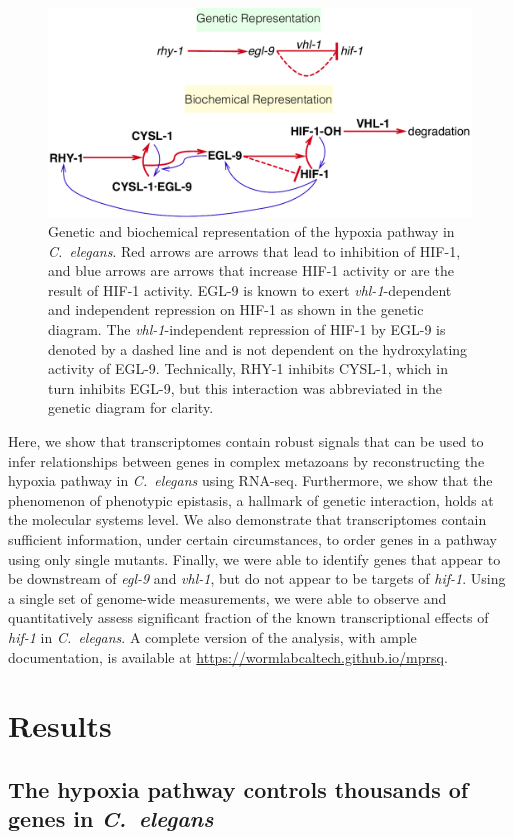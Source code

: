 \documentclass[10pt, onecolumn]{article}
\newcommand{\cel}{\emph{C.~elegans}}
\newcommand{\gene}[1]{\emph{#1}}
\newcommand{\eglp}{EGL-9}
\newcommand{\hifp}{HIF-1}
\begin{document}
\begin{figure}[tbhp]
\centering
\includegraphics[width=.7\textwidth]{../figs/HIF1pathway.pdf}
\caption{
Genetic and biochemical representation of the hypoxia pathway in \cel{}.
Red arrows are arrows that lead to inhibition of \hifp{}, and blue arrows
are arrows that increase \hifp{} activity or are the result of \hifp{} activity.
\eglp{} is known to exert \gene{vhl-1}-dependent and independent repression
on \hifp{} as shown in the genetic diagram. The \gene{vhl-1}-independent
repression of \hifp{} by \eglp{} is denoted by a dashed line and is not dependent
on the hydroxylating activity of \eglp{}.
Technically, RHY-1 inhibits CYSL-1, which in turn inhibits EGL-9, but this
interaction was abbreviated in the genetic diagram for clarity.
}
\label{fig:pathway}
\end{figure}

Here, we show that transcriptomes contain robust signals that can be
used to infer relationships between genes in complex metazoans by reconstructing
the hypoxia pathway in \cel{} using RNA-seq.
Furthermore, we show that the phenomenon of phenotypic epistasis, a hallmark of
genetic interaction, holds at the molecular systems level.
We also demonstrate that transcriptomes contain sufficient information, under
certain circumstances, to order genes in a pathway using only single mutants.
Finally, we were able to identify genes that appear to be downstream of \gene{egl-9}
and \gene{vhl-1}, but do not appear to be targets of \gene{hif-1}.
Using a single set of genome-wide measurements, we were able to observe and
quantitatively assess  significant fraction of the known transcriptional
effects of \gene{hif-1} in \cel{}.
A complete version of the analysis, with ample documentation, is available at
\url{https://wormlabcaltech.github.io/mprsq}.

\section*{Results}
\subsection*{The hypoxia pathway controls thousands of genes in \cel{}}
\label{sub:summary}
\end{document}
